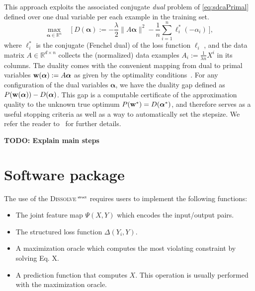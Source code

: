 \documentclass[twoside,11pt]{article}
\newcommand{\algname}{\textsc{Dissolve}$\,^{\textsf{\tiny struct}}$\xspace}
\newcommand{\pnorm}[2]{\| {#1} \|_{#2}}
\newcommand{\norm}[1]{\pnorm{#1}{}}
\newcommand{\av}{\bm{\alpha}}
\newcommand{\wv}{{\bf w}}
\newcommand{\R}{\mathbb{R}}
\begin{document}
This approach exploits the associated conjugate \emph{dual} problem of \eqref{eq:sdcaPrimal} defined over one dual variable per each example in
the training set.
\begin{equation}
    \label{eq:sdcaDual}
    \max_{\av \in \R^n} \quad \Big[ \ 
    D(\av) := - \frac{\lambda}{2} \norm{ A\av }^2
    - \frac1n \sum_{i=1}^n \ell_i^*(-\alpha_i) \ \Big],
\end{equation}
where $\ell_i^*$ is the conjugate (Fenchel dual) of the loss function
$\ell_i$%
, and the data matrix $A\in\R^{d\times n}$ collects the (normalized) data
examples $A_i := \frac{1}{\lambda n} X^i$ in its columns. The duality comes with the convenient mapping from dual to primal variables
$\wv(\av) := A\av$ as given by the optimality
conditions~\cite{ShalevShwartz:2013wl}.
For any configuration of the dual variables $\av$, we have the duality gap
defined as $P(\wv(\av)) - D(\av)$. This gap is a computable certificate of
the approximation quality to the unknown true optimum $P(\wv^*) = D(\av^*)$,
and therefore serves as a useful stopping criteria as well as a way to automatically set the stepsize. We refer the reader to~\cite{Jaggi:2014vi} for further details.

{\bf TODO: Explain main steps}

\section{Software package}

The use of the \algname requires users to implement the following functions:
\begin{itemize}
\item The joint feature map $\Psi(X,Y)$ which encodes the input/output pairs.
\item The structured loss function $\Delta(Y_i,Y)$.
\item A maximization oracle which computes the most violating constraint by solving Eq. X.
\item A prediction function that computes $X$. This operation is usually performed with the maximization oracle.
\end{itemize}
\end{document}

